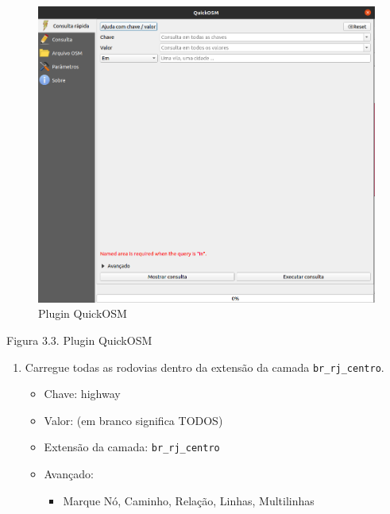\documentclass[
  portuguese,
]{krantz}
\providecommand{\tightlist}{%
  \setlength{\itemsep}{0pt}\setlength{\parskip}{0pt}}
\begin{document}
\begin{figure}
\centering
\includegraphics{media/modulo3/quickosm-2.png}
\caption{Plugin QuickOSM}
\end{figure}

Figura 3.3. Plugin QuickOSM

\begin{enumerate}
\def\labelenumi{\arabic{enumi}.}
\setcounter{enumi}{3}
\item
  Carregue todas as rodovias dentro da extensão da camada \texttt{br\_rj\_centro}.

  \begin{itemize}
  \tightlist
  \item
    Chave: highway
  \item
    Valor: (em branco significa TODOS)
  \item
    Extensão da camada: \texttt{br\_rj\_centro}
  \item
    Avançado:

    \begin{itemize}
    \tightlist
    \item
      Marque Nó, Caminho, Relação, Linhas, Multilinhas
    \end{itemize}
  \end{itemize}
\end{enumerate}
\end{document}

